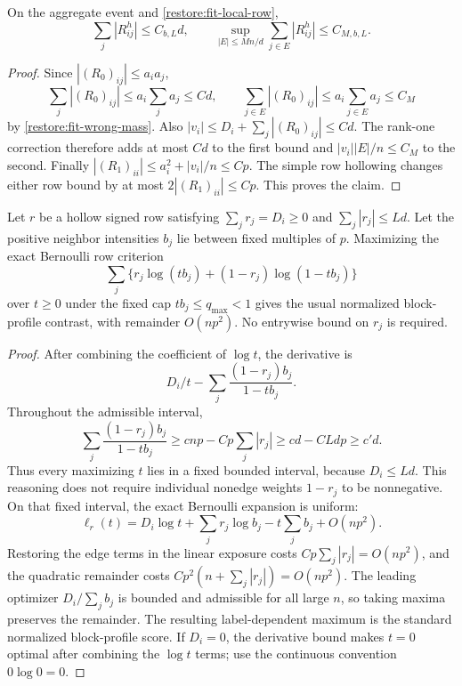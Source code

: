 \begin{lemma}
\label{restore:fit-local-mass}
On the aggregate event and \eqref{restore:fit-local-row},
\begin{equation}\label{restore:fit-local-mass-bounds}
 \sum_j|R^h_{ij}|\le C_{b,L}d,\qquad
 \sup_{|E|\le Mn/d}\sum_{j\in E}|R^h_{ij}|\le C_{M,b,L}.
\end{equation}
\end{lemma}

\begin{proof}
Since $|(R_0)_{ij}|\le a_ia_j$,
\[
 \sum_j|(R_0)_{ij}|\le a_i\sum_j a_j\le Cd,\qquad
 \sum_{j\in E}|(R_0)_{ij}|
       \le a_i\sum_{j\in E}a_j\le C_M
\]
by \cref{restore:fit-wrong-mass}. Also
$|v_i|\le D_i+\sum_j|(R_0)_{ij}|\le Cd$.
The rank-one correction therefore adds at most $Cd$ to the first
bound and $|v_i||E|/n\le C_M$ to the second.
Finally $|(R_1)_{ii}|\le a_i^2+|v_i|/n\le Cp$.
The simple row hollowing changes either row bound by at most
$2|(R_1)_{ii}|\le Cp$. This proves the claim.
\end{proof}

\begin{lemma}
\label{restore:fit-profile}
Let $r$ be a hollow signed row satisfying
$\sum_jr_j=D_i\ge0$ and $\sum_j|r_j|\le Ld$.
Let the positive neighbor intensities $b_j$ lie between fixed
multiples of $p$. Maximizing the exact Bernoulli row criterion
\[
 \sum_j\{r_j\log(tb_j)+(1-r_j)\log(1-tb_j)\}
\]
over $t\ge0$ under the fixed cap $tb_j\le q_{\max}<1$ gives the
usual normalized block-profile contrast, with remainder $O(np^2)$.
No entrywise bound on $r_j$ is required.
\end{lemma}

\begin{proof}
After combining the coefficient of $\log t$, the derivative is
\[
 D_i/t-\sum_j\frac{(1-r_j)b_j}{1-tb_j}.
\]
Throughout the admissible interval,
\[
 \sum_j\frac{(1-r_j)b_j}{1-tb_j}
 \ge cnp-Cp\sum_j|r_j|
 \ge cd-CLdp\ge c'd.
\]
Thus every maximizing $t$ lies in a fixed bounded interval,
because $D_i\le Ld$. This reasoning does not require individual
nonedge weights $1-r_j$ to be nonnegative.
On that fixed interval, the exact Bernoulli expansion is uniform:
\[
 \ell_r(t)
   =D_i\log t+\sum_jr_j\log b_j
         -t\sum_jb_j+O(np^2).
\]
Restoring the edge terms in the linear exposure costs
$Cp\sum_j|r_j|=O(np^2)$, and the quadratic remainder costs
$Cp^2(n+\sum_j|r_j|)=O(np^2)$.
The leading optimizer $D_i/\sum_jb_j$ is bounded and admissible
for all large $n$, so taking maxima preserves the remainder.
The resulting label-dependent maximum is the standard normalized
block-profile score. If $D_i=0$, the derivative bound makes $t=0$
optimal after combining the $\log t$ terms; use the continuous
convention $0\log0=0$.
\end{proof}

